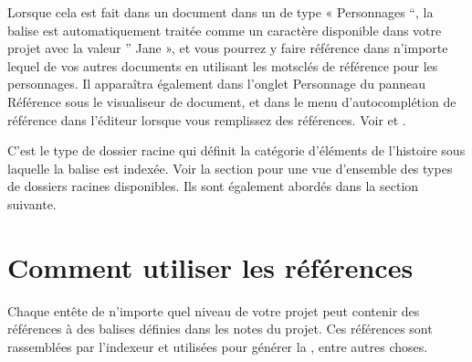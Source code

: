 \documentclass[a4paper,11pt,french]{sphinxmanual}
\begin{document}
\sphinxAtStartPar
Lorsque cela est fait dans un document dans un {\hyperref[\detokenize{int_glossary:term-Root-Folder}]{}} de type « Personnages “, la balise est automatiquement traitée comme un caractère disponible dans votre projet avec la valeur ” Jane », et vous pourrez y faire référence dans n’importe lequel de vos autres documents en utilisant les mots\sphinxhyphen{}clés de référence pour les personnages. Il apparaîtra également dans l’onglet Personnage du panneau Référence sous le visualiseur de document, et dans le menu d’auto\sphinxhyphen{}complétion de référence dans l’éditeur lorsque vous remplissez des références. Voir {\hyperref[\detokenize{usage_writing:a-ui-view}]{}} et {\hyperref[\detokenize{project_references:a-references-completer}]{}}.

\sphinxAtStartPar
C’est le type de dossier racine qui définit la catégorie d’éléments de l’histoire sous laquelle la balise est indexée. Voir la section {\hyperref[\detokenize{project_overview:a-proj-roots}]{}} pour une vue d’ensemble des types de dossiers racines disponibles. Ils sont également abordés dans la section suivante.


\section{Comment utiliser les références}
\label{\detokenize{project_references:how-to-use-references}}\label{\detokenize{project_references:a-references-references}}
\sphinxAtStartPar
Chaque en\sphinxhyphen{}tête de n’importe quel niveau de votre projet peut contenir des références à des balises définies dans les notes du projet. Ces références sont rassemblées par l’indexeur et utilisées pour générer la , entre autres choses.
\end{document}
